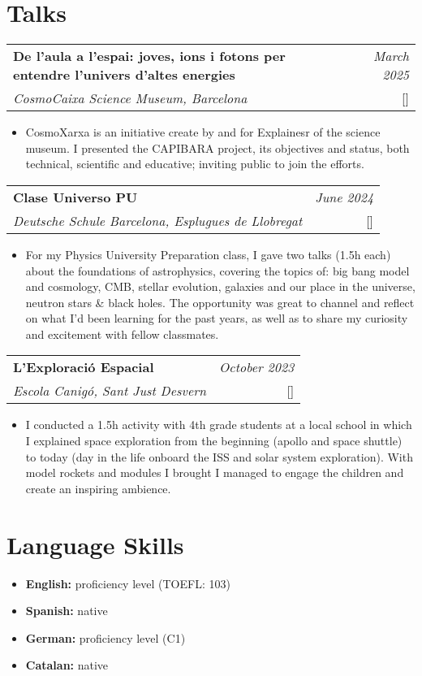 \documentclass[a4paper,11pt]{article}
\makeatletter
\newcommand{\resumeProject}[4]{
\vspace{0.5mm}\item
    \begin{tabular*}{0.98\textwidth}[t]{l@{\extracolsep{\fill}}r}
        \textbf{#1} & \textit{\footnotesize{#3}} \\
        \footnotesize{\textit{#2}} & \footnotesize{#4}
    \end{tabular*}
    \vspace{-2.4mm}
}
\newcommand{\resumeItemListStart}{\begin{itemize}[leftmargin=*,labelsep=1mm,itemsep=0.5mm]}
\newcommand{\resumeItemListEnd}{\end{itemize}\vspace{-2mm}}
\makeatother
\begin{document}
{\section{\textbf{Talks}}
\vspace{-0.4mm}
\resumeProject
  {De l'aula a l'espai: joves, ions i fotons per entendre l'univers d'altes energies}
  {CosmoCaixa Science Museum, Barcelona}
  {March 2025}
  {{}[\href{}{\textcolor{darkblue}{\faIcon{globe}}}]}
\resumeItemListStart
  \item CosmoXarxa is an initiative create by and for Explainesr of the science museum. I presented the CAPIBARA project, its objectives and status, both technical, scientific and educative; inviting public to join the efforts.
\resumeItemListEnd
\resumeProject
  {Clase Universo PU}
  {Deutsche Schule Barcelona, Esplugues de Llobregat}
  {June 2024}
  {{}[\href{}{\textcolor{darkblue}{\faIcon{globe}}}]}
\resumeItemListStart
  \item For my Physics University Preparation class, I gave two talks (1.5h each) about the foundations of astrophysics, covering the topics of: big bang model and cosmology, CMB, stellar evolution, galaxies and our place in the universe, neutron stars & black holes. The opportunity was great to channel and reflect on what I'd been learning for the past years, as well as to share my curiosity and excitement with fellow classmates.
\resumeItemListEnd
\resumeProject
  {L'Exploració Espacial}
  {Escola Canigó, Sant Just Desvern}
  {October 2023}
  {{}[\href{}{\textcolor{darkblue}{\faIcon{globe}}}]}
\resumeItemListStart
  \item I conducted a 1.5h activity with 4th grade students at a local school in which I explained space exploration from the beginning (apollo and space shuttle) to today (day in the life onboard the ISS and solar system exploration). With model rockets and modules I brought I managed to engage the children and create an inspiring ambience.
\resumeItemListEnd

\section{\textbf{Language Skills}}
\vspace{-0.4mm}
\resumeItemListStart
  \item \textbf{English:}  proficiency level (TOEFL: 103)
  \item \textbf{Spanish:}  native
  \item \textbf{German:} proficiency level (C1)
  \item \textbf{Catalan:}  native
\resumeItemListEnd
\vspace{-4mm}

}
\end{document}
